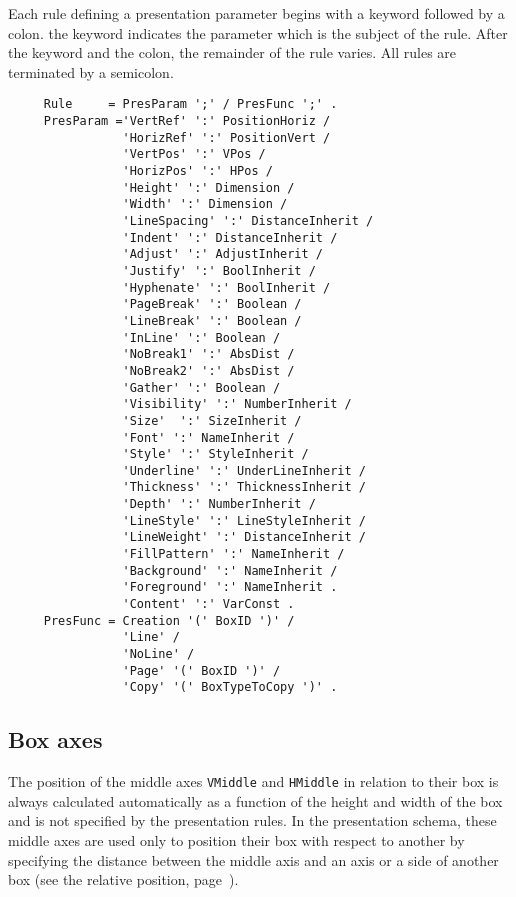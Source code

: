 Each rule defining a presentation parameter begins with a keyword
followed by a colon. the keyword indicates the parameter which is the
subject of the rule.  After the keyword and the colon, the remainder
of the rule varies.  All rules are terminated by a semicolon.

\begin{verbatim}
     Rule     = PresParam ';' / PresFunc ';' .
     PresParam ='VertRef' ':' PositionHoriz /
                'HorizRef' ':' PositionVert /
                'VertPos' ':' VPos /
                'HorizPos' ':' HPos /
                'Height' ':' Dimension /
                'Width' ':' Dimension /
                'LineSpacing' ':' DistanceInherit /
                'Indent' ':' DistanceInherit /
                'Adjust' ':' AdjustInherit /
                'Justify' ':' BoolInherit /
                'Hyphenate' ':' BoolInherit /
                'PageBreak' ':' Boolean /
                'LineBreak' ':' Boolean /
                'InLine' ':' Boolean /
                'NoBreak1' ':' AbsDist /
                'NoBreak2' ':' AbsDist /
                'Gather' ':' Boolean /
                'Visibility' ':' NumberInherit /
                'Size'  ':' SizeInherit /
                'Font' ':' NameInherit /
                'Style' ':' StyleInherit /
                'Underline' ':' UnderLineInherit /
                'Thickness' ':' ThicknessInherit /
                'Depth' ':' NumberInherit /
                'LineStyle' ':' LineStyleInherit /
                'LineWeight' ':' DistanceInherit /
                'FillPattern' ':' NameInherit /
                'Background' ':' NameInherit /
                'Foreground' ':' NameInherit .
                'Content' ':' VarConst .
     PresFunc = Creation '(' BoxID ')' /
                'Line' /
                'NoLine' /
                'Page' '(' BoxID ')' /
                'Copy' '(' BoxTypeToCopy ')' .
\end{verbatim}

\subsection{Box axes}

The position of the middle axes {\tt VMiddle} and {\tt HMiddle} in
relation to their box is always calculated automatically as a function
of the height and width of the box and is not specified by the
presentation rules.  In the presentation schema, these middle axes are
used only to position their box with respect to another by specifying
the distance between the middle axis and an axis or a side of another
box (see the relative position, page~\pageref{position}).

